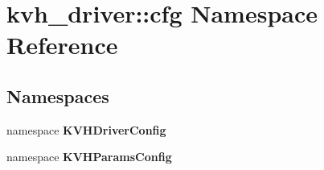 \section{kvh\-\_\-driver\-:\-:cfg \-Namespace \-Reference}
\label{namespacekvh__driver_1_1cfg}
\subsection*{\-Namespaces}
\begin{DoxyCompactItemize}
\item 
namespace {\bf \-K\-V\-H\-Driver\-Config}
\item 
namespace {\bf \-K\-V\-H\-Params\-Config}
\end{DoxyCompactItemize}
